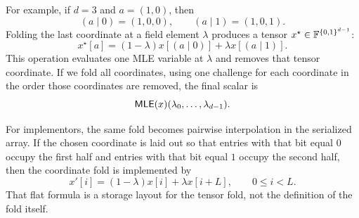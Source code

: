 For example, if $d=3$ and $a=(1,0)$, then
\[
  (a\mid 0)=(1,0,0),
  \qquad
  (a\mid 1)=(1,0,1).
\]
Folding the last coordinate at a field element $\lambda$ produces a tensor
$x^\star\in\mathbb{F}^{\{0,1\}^{d-1}}$:
\[
  x^\star[a]
  =
  (1-\lambda)x[(a\mid 0)]
  +
  \lambda x[(a\mid 1)].
\]
This operation evaluates one MLE variable at $\lambda$ and removes that tensor
coordinate.  If we fold all coordinates, using one challenge for each coordinate
in the order those coordinates are removed, the final scalar is
\[
  \mathsf{MLE}(x)(\lambda_0,\ldots,\lambda_{d-1}).
\]

For implementors, the same fold becomes pairwise interpolation in the serialized
array.  If the chosen coordinate is laid out so that entries with that bit equal
$0$ occupy the first half and entries with that bit equal $1$ occupy the second
half, then the coordinate fold is implemented by
\[
  x'[i]=(1-\lambda)x[i]+\lambda x[i+L],
  \qquad 0\le i<L.
\]
That flat formula is a storage layout for the tensor fold, not the definition
of the fold itself.
